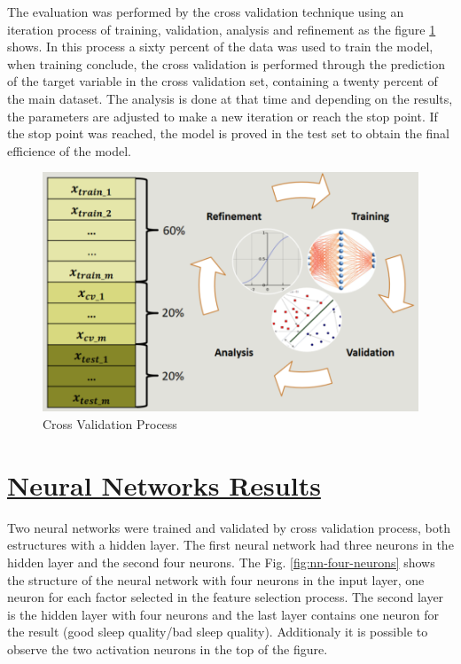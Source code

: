 \documentclass[]{book}
\begin{document}
The evaluation was performed by the cross validation technique using an
iteration process of training, validation, analysis and refinement as
the figure \ref{fig:cross-validation-process} shows. In this process a
sixty percent of the data was used to train the model, when training
conclude, the cross validation is performed through the prediction of
the target variable in the cross validation set, containing a twenty
percent of the main dataset. The analysis is done at that time and
depending on the results, the parameters are adjusted to make a new
iteration or reach the stop point. If the stop point was reached, the
model is proved in the test set to obtain the final efficience of the
model.

\begin{figure}[H]

{\centering \includegraphics[width=0.8\linewidth]{images/cross-validation-process} 

}

\caption{Cross Validation Process}\label{fig:cross-validation-process}
\end{figure}

\section{\texorpdfstring{\protect\hyperlink{NN-results}{Neural Networks
Results}}{Neural Networks Results}}\label{neural-networks-results}

Two neural networks were trained and validated by cross validation
process, both estructures with a hidden layer. The first neural network
had three neurons in the hidden layer and the second four neurons. The
Fig. \ref{fig:nn-four-neurons} shows the structure of the neural network
with four neurons in the input layer, one neuron for each factor
selected in the feature selection process. The second layer is the
hidden layer with four neurons and the last layer contains one neuron
for the result (good sleep quality/bad sleep quality). Additionaly it is
possible to observe the two activation neurons in the top of the figure.
\end{document}
